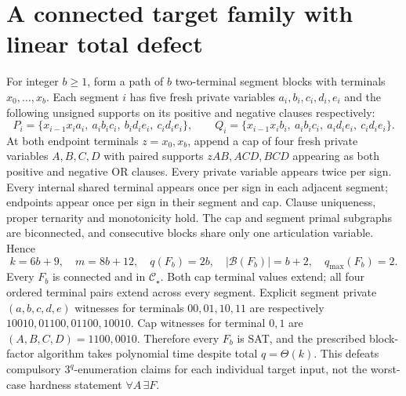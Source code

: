 \documentclass[11pt]{article}
\begin{document}
\section{A connected target family with linear total defect}
For integer $b\ge1$, form a path of $b$ two-terminal segment blocks with terminals $x_0,\ldots,x_b$. Each segment $i$ has five fresh private variables $a_i,b_i,c_i,d_i,e_i$ and the following unsigned supports on its positive and negative clauses respectively:
\[
P_i=\{x_{i-1}x_i a_i,\ a_ib_ic_i,\ b_id_ie_i,\ c_id_ie_i\},\qquad
Q_i=\{x_{i-1}x_i b_i,\ a_ib_ic_i,\ a_id_ie_i,\ c_id_ie_i\}.
\]
At both endpoint terminals $z=x_0,x_b$, append a cap of four fresh private variables $A,B,C,D$ with paired supports $zAB,ACD,BCD$ appearing as both positive and negative OR clauses. Every private variable appears twice per sign. Every internal shared terminal appears once per sign in each adjacent segment; endpoints appear once per sign in their segment and cap. Clause uniqueness, proper ternarity and monotonicity hold. The cap and segment primal subgraphs are biconnected, and consecutive blocks share only one articulation variable. Hence
\[
k=6b+9,\quad m=8b+12,\quad q(F_b)=2b,\quad
|\mathcal B(F_b)|=b+2,\quad q_{\max}(F_b)=2.
\]
Every $F_b$ is connected and in $\mathcal C_\star$. Both cap terminal values extend; all four ordered terminal pairs extend across every segment. Explicit segment private $(a,b,c,d,e)$ witnesses for terminals $00,01,10,11$ are respectively $10010,01100,01100,10010$. Cap witnesses for terminal $0,1$ are $(A,B,C,D)=1100,0010$. Therefore every $F_b$ is SAT, and the prescribed block-factor algorithm takes polynomial time despite total $q=\Theta(k)$. This defeats compulsory $3^q$-enumeration claims for each individual target input, not the worst-case hardness statement $\forall A\,\exists F$.
\end{document}

